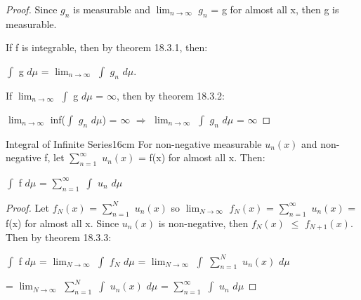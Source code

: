     \begin{proof}
        Since $g_n$ is measurable and $\lim_{n \rightarrow \infty}$ $g_n$ = g
        for almost all x, then g is measurable.

        If f is integrable, then by {\color{red} theorem 18.3.1}, then:
        
        \hspace{0.5cm}
        $\int$ g $d\mu$ = $\lim_{n \rightarrow \infty}$ $\int$ $g_n$ $d\mu$.

        If $\lim_{n \rightarrow \infty}$ $\int$ g $d\mu$ = $\infty$,
        then by {\color{red} theorem 18.3.2}:

        \hspace{0.5cm}
        $\lim_{n \rightarrow \infty}$ inf($\int$ $g_n$ $d\mu$) = $\infty$
        \hspace{0.5cm}
        $\Rightarrow$
        \hspace{0.5cm}
        $\lim_{n \rightarrow \infty}$ $\int$ $g_n$ $d\mu$ = $\infty$
    \end{proof}

    \vspace{0.5cm}



    \begin{corollary}{Integral of Infinite Series}{16cm}
        For non-negative measurable $u_n(x)$ and non-negative f,
        let $\sum_{n=1}^{\infty}$ $u_n(x)$ = f(x) for almost all x. Then:

        \hspace{0.5cm}
        $\int$ f $d\mu$ = $\sum_{n=1}^{\infty}$ $\int$ $u_n$ $d\mu$
    \end{corollary}

    \begin{proof}
        Let $f_N(x)$ = $\sum_{n=1}^N$ $u_n(x)$ so
        $\lim_{N \rightarrow \infty}$ $f_N(x)$
        = $\sum_{n=1}^{\infty}$ $u_n(x)$ = f(x) for almost all x.
        Since $u_n(x)$ is non-negative, then $f_N(x)$ $\leq$ $f_{N+1}(x)$.
        Then by {\color{red} theorem 18.3.3}:

        \hspace{0.5cm}
        $\int$ f $d\mu$
        = $\lim_{N \rightarrow \infty}$ $\int$ $f_N$ $d\mu$
        = $\lim_{N \rightarrow \infty}$ $\int$ $\sum_{n=1}^N$ $u_n(x)$ $d\mu$

        \hspace{1.8cm}
        = $\lim_{N \rightarrow \infty}$ $\sum_{n=1}^N$ $\int$ $u_n(x)$ $d\mu$
        = $\sum_{n=1}^{\infty}$ $\int$ $u_n$ $d\mu$
    \end{proof}

